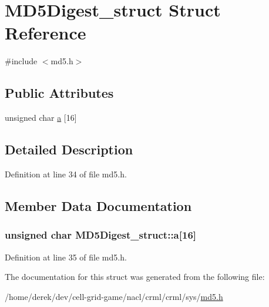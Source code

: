 \hypertarget{struct_m_d5_digest__struct}{
\section{MD5Digest\_\-struct Struct Reference}
\label{struct_m_d5_digest__struct}
}


{\ttfamily \#include $<$md5.h$>$}

\subsection*{Public Attributes}
\begin{DoxyCompactItemize}
\item 
unsigned char \hyperlink{struct_m_d5_digest__struct_a47ba426c0b835e8947717e860464b255}{a} \mbox{[}16\mbox{]}
\end{DoxyCompactItemize}


\subsection{Detailed Description}


Definition at line 34 of file md5.h.



\subsection{Member Data Documentation}
\hypertarget{struct_m_d5_digest__struct_a47ba426c0b835e8947717e860464b255}{
\subsubsection[{a}]{\setlength{\rightskip}{0pt plus 5cm}unsigned char {\bf MD5Digest\_\-struct::a}\mbox{[}16\mbox{]}}}
\label{struct_m_d5_digest__struct_a47ba426c0b835e8947717e860464b255}


Definition at line 35 of file md5.h.



The documentation for this struct was generated from the following file:\begin{DoxyCompactItemize}
\item 
/home/derek/dev/cell-\/grid-\/game/nacl/crml/crml/sys/\hyperlink{md5_8h}{md5.h}\end{DoxyCompactItemize}
